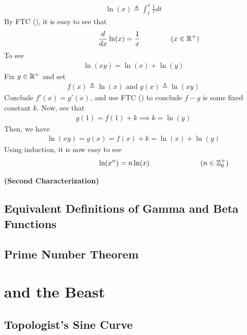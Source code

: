 \documentclass{report}
\begin{document}
\begin{mdframed}
\begin{align*}
\ln (x)\triangleq \int_1^x \frac{1}{t}dt
\end{align*}
By FTC (), it is easy to see that 
 \begin{align*}
\hspace{1.5cm}\frac{d}{dx}\ln (x)=\frac{1}{x}\hspace{1.5cm}(x\in\mathbb{R}^+)
\end{align*}
To see 
\begin{align*}
\ln (xy)=\ln (x)+ \ln (y)
\end{align*}
Fix $y\in\mathbb{R}^+$ and set 
\begin{align*}
f(x)\triangleq \ln (x)\text{ and }g(x)\triangleq \ln(xy)
\end{align*}
Conclude $f'(x)=g'(x)$, and use FTC () to conclude $f-g$ is some fixed constant $k$. Now, see that 
\begin{align*}
g(1)=f(1)+k \implies k=\ln(y)
\end{align*}
Then, we have 
\begin{align*}
\ln(xy)=g(x)=f(x)+k=\ln (x)+ \ln (y)
\end{align*}
Using induction, it is now easy to see 
\begin{align*}
  \hspace{3cm}\ln (x^n)=n \ln (x)\hspace{2.5cm}(n\inz_0^+)
\end{align*}
\end{mdframed}
\begin{theorem}
\textbf{(Second Characterization)}
\end{theorem}
\section{Equivalent Definitions of Gamma and Beta Functions}
\section{Prime Number Theorem}


\chapter{and the Beast}
\section{Topologist's Sine Curve}
\label{Topologist's Sine Curve}
\end{document}

